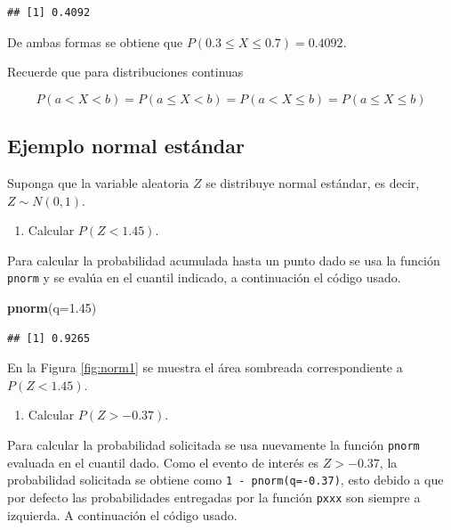 \documentclass[10pt,]{krantz}
\makeatletter
\newenvironment{Shaded}{\begin{snugshade}}{\end{snugshade}}
\newcommand{\KeywordTok}[1]{\textcolor[rgb]{0.13,0.29,0.53}{\textbf{{#1}}}}
\newcommand{\DataTypeTok}[1]{\textcolor[rgb]{0.13,0.29,0.53}{{#1}}}
\newcommand{\FloatTok}[1]{\textcolor[rgb]{0.00,0.00,0.81}{{#1}}}
\newcommand{\NormalTok}[1]{{#1}}
\providecommand{\tightlist}{%
  \setlength{\itemsep}{0pt}\setlength{\parskip}{0pt}}
\newenvironment{kframe}{%
\medskip{}
\setlength{\fboxsep}{.8em}
 \def\at@end@of@kframe{}%
 \ifinner\ifhmode%
  \def\at@end@of@kframe{\end{minipage}}%
  \begin{minipage}{\columnwidth}%
 \fi\fi%
 \def\FrameCommand##1{\hskip\@totalleftmargin \hskip-\fboxsep
 \colorbox{shadecolor}{##1}\hskip-\fboxsep
     \hskip-\linewidth \hskip-\@totalleftmargin \hskip\columnwidth}%
 \MakeFramed {\advance\hsize-\width
   \@totalleftmargin\z@ \linewidth\hsize
   \@setminipage}}%
 {\par\unskip\endMakeFramed%
 \at@end@of@kframe}
\renewenvironment{Shaded}{\begin{kframe}}{\end{kframe}}
\let\BeginKnitrBlock\begin \let\EndKnitrBlock\end
\makeatother
\begin{document}
\begin{verbatim}
## [1] 0.4092
\end{verbatim}

De ambas formas se obtiene que \(P(0.3 \leq X \leq 0.7)=0.4092\).

\BeginKnitrBlock{rmdnote}
Recuerde que para distribuciones continuas

\[ P(a < X < b) = P(a \leq X < b) = P(a < X \leq b) = P(a \leq X \leq b)\]
\EndKnitrBlock{rmdnote}

\subsection*{Ejemplo normal estándar}\label{ejemplo-normal-estandar}


Suponga que la variable aleatoria \(Z\) se distribuye normal estándar,
es decir, \(Z \sim N(0, 1)\).

\begin{enumerate}
\def\labelenumi{\arabic{enumi})}
\tightlist
\item
  Calcular \(P(Z < 1.45)\).
\end{enumerate}

Para calcular la probabilidad acumulada hasta un punto dado se usa la
función \texttt{pnorm} y se evalúa en el cuantil indicado, a
continuación el código usado.

\begin{Shaded}
\begin{Highlighting}[]
\KeywordTok{pnorm}\NormalTok{(}\DataTypeTok{q=}\FloatTok{1.45}\NormalTok{)}
\end{Highlighting}
\end{Shaded}

\begin{verbatim}
## [1] 0.9265
\end{verbatim}

En la Figura \ref{fig:norm1} se muestra el área sombreada
correspondiente a \(P(Z < 1.45)\).

\begin{enumerate}
\def\labelenumi{\arabic{enumi})}
\setcounter{enumi}{1}
\tightlist
\item
  Calcular \(P(Z > -0.37)\).
\end{enumerate}

Para calcular la probabilidad solicitada se usa nuevamente la función
\texttt{pnorm} evaluada en el cuantil dado. Como el evento de interés es
\(Z > -0.37\), la probabilidad solicitada se obtiene como
\texttt{1\ -\ pnorm(q=-0.37)}, esto debido a que por defecto las
probabilidades entregadas por la función \texttt{pxxx} son siempre a
izquierda. A continuación el código usado.
\end{document}
